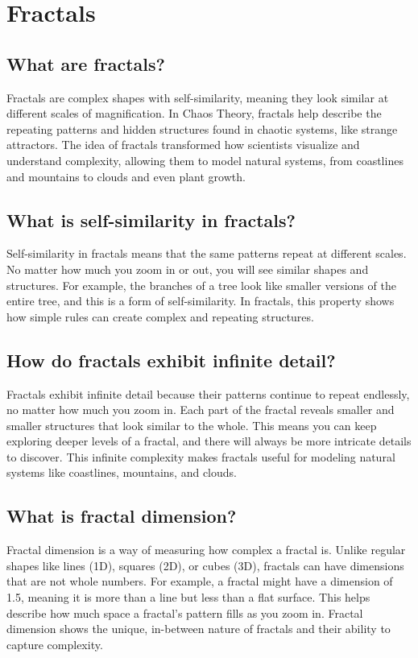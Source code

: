 \documentclass[12pt]{article}
\begin{document}
\section{Fractals}
\subsection{What are fractals?}
Fractals are complex shapes with self-similarity, meaning they look similar at different scales of magnification. In Chaos Theory, fractals help describe the repeating patterns and hidden structures found in chaotic systems, like strange attractors. The idea of fractals transformed how scientists visualize and understand complexity, allowing them to model natural systems, from coastlines and mountains to clouds and even plant growth.

\subsection{What is self-similarity in fractals?}
Self-similarity in fractals means that the same patterns repeat at different scales. No matter how much you zoom in or out, you will see similar shapes and structures. For example, the branches of a tree look like smaller versions of the entire tree, and this is a form of self-similarity. In fractals, this property shows how simple rules can create complex and repeating structures.

\subsection{How do fractals exhibit infinite detail?}
Fractals exhibit infinite detail because their patterns continue to repeat endlessly, no matter how much you zoom in. Each part of the fractal reveals smaller and smaller structures that look similar to the whole. This means you can keep exploring deeper levels of a fractal, and there will always be more intricate details to discover. This infinite complexity makes fractals useful for modeling natural systems like coastlines, mountains, and clouds.

\subsection{What is fractal dimension?}
Fractal dimension is a way of measuring how complex a fractal is. Unlike regular shapes like lines (1D), squares (2D), or cubes (3D), fractals can have dimensions that are not whole numbers. For example, a fractal might have a dimension of 1.5, meaning it is more than a line but less than a flat surface. This helps describe how much space a fractal's pattern fills as you zoom in. Fractal dimension shows the unique, in-between nature of fractals and their ability to capture complexity.
\end{document}
